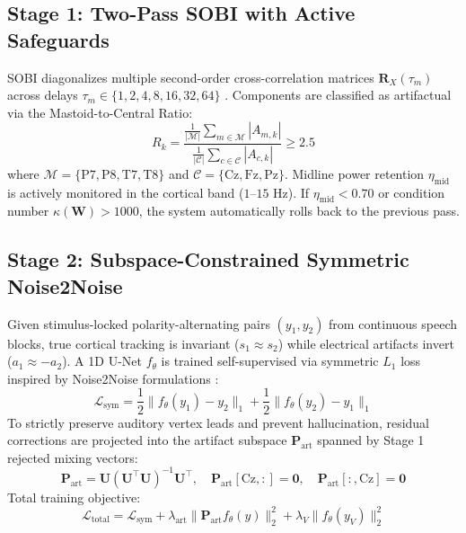 \documentclass[11pt]{article}
\begin{document}
\subsection{Stage 1: Two-Pass SOBI with Active Safeguards}
SOBI diagonalizes multiple second-order cross-correlation matrices $\mathbf{R}_X(\tau_m)$ across delays $\tau_m \in \{1, 2, 4, 8, 16, 32, 64\}$ \cite{belouchrani1997blind}. Components are classified as artifactual via the Mastoid-to-Central Ratio:
\begin{equation}
R_k = \frac{\frac{1}{|\mathcal{M}|} \sum_{m \in \mathcal{M}} |A_{m, k}|}{\frac{1}{|\mathcal{C}|} \sum_{c \in \mathcal{C}} |A_{c, k}|} \ge 2.5
\end{equation}
where $\mathcal{M} = \{\text{P7}, \text{P8}, \text{T7}, \text{T8}\}$ and $\mathcal{C} = \{\text{Cz}, \text{Fz}, \text{Pz}\}$.
Midline power retention $\eta_{\text{mid}}$ is actively monitored in the cortical band ($1\text{--}15\text{ Hz}$). If $\eta_{\text{mid}} < 0.70$ or condition number $\kappa(\mathbf{W}) > 1000$, the system automatically rolls back to the previous pass.

\subsection{Stage 2: Subspace-Constrained Symmetric Noise2Noise}
Given stimulus-locked polarity-alternating pairs $(y_1, y_2)$ from continuous speech blocks, true cortical tracking is invariant ($s_1 \approx s_2$) while electrical artifacts invert ($a_1 \approx -a_2$). A 1D U-Net $f_\theta$ is trained self-supervised via symmetric $L_1$ loss inspired by Noise2Noise formulations \cite{lehtinen2018noise2noise}:
\begin{equation}
\mathcal{L}_{\text{sym}} = \frac{1}{2} \|f_\theta(y_1) - y_2\|_1 + \frac{1}{2} \|f_\theta(y_2) - y_1\|_1
\end{equation}
To strictly preserve auditory vertex leads and prevent hallucination, residual corrections are projected into the artifact subspace $\mathbf{P}_{\text{art}}$ spanned by Stage 1 rejected mixing vectors:
\begin{equation}
\mathbf{P}_{\text{art}} = \mathbf{U} (\mathbf{U}^\top \mathbf{U})^{-1} \mathbf{U}^\top, \quad \mathbf{P}_{\text{art}}[\text{Cz}, :] = \mathbf{0}, \quad \mathbf{P}_{\text{art}}[:, \text{Cz}] = \mathbf{0}
\end{equation}
Total training objective:
\begin{equation}
\mathcal{L}_{\text{total}} = \mathcal{L}_{\text{sym}} + \lambda_{\text{art}} \|\mathbf{P}_{\text{art}} f_\theta(y)\|_2^2 + \lambda_V \|f_\theta(y_V)\|_2^2
\end{equation}
\end{document}
